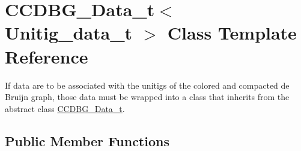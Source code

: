 \hypertarget{classCCDBG__Data__t}{}\section{C\+C\+D\+B\+G\+\_\+\+Data\+\_\+t$<$ Unitig\+\_\+data\+\_\+t $>$ Class Template Reference}
\label{classCCDBG__Data__t}


If data are to be associated with the unitigs of the colored and compacted de Bruijn graph, those data must be wrapped into a class that inherits from the abstract class \hyperlink{classCCDBG__Data__t}{C\+C\+D\+B\+G\+\_\+\+Data\+\_\+t}.  


\subsection*{Public Member Functions}
